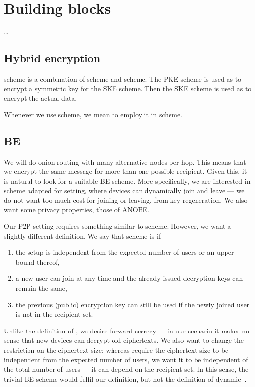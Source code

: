 \section{Building blocks}%
\label{BuildingBlocks}

\dots

\subsection{Hybrid encryption}\label{KEM}

 scheme is a combination of  scheme and  scheme.
The \ac{PKE} scheme is used as  to encrypt a symmetric key for the 
\ac{SKE} scheme.
Then the \ac{SKE} scheme is used as  to encrypt the actual data.

Whenever we use  scheme, we mean to employ it in  scheme.

\subsection{\Acl*{BE}}\label{BE}

We will do onion routing with many alternative nodes per hop.
This means that we encrypt the same message for more than one possible 
recipient.
Given this, it is natural to look for a suitable \ac{BE} scheme.
More specifically, we are interested in  scheme adapted for  
setting, where devices can dynamically join and leave --- \ie we do not want too 
much cost for joining or leaving, \eg from key regeneration.
We also want some privacy properties, \eg those of \ac{ANOBE}.

Our \ac{P2P} setting requires something similar to  scheme.
However, we want a slightly different definition.
We say that  scheme is  if
\begin{enumerate}
  \item the setup is independent from the expected number of users or an upper 
    bound thereof,
  \item a new user can join at any time and the already issued decryption keys 
    can remain the same,
  \item the previous (public) encryption key can still be used if the newly 
    joined user is not in the recipient set.
\end{enumerate}
Unlike the definition of \textcite{DynamicBroadcastEncryption}, we desire 
forward secrecy --- in our scenario it makes no sense that new devices can 
decrypt old ciphertexts.
We also want to change the restriction on the ciphertext size:
whereas \textcite{DynamicBroadcastEncryption} require the ciphertext size to be 
independent from the expected number of users, we want it to be independent of 
the total number of users --- \ie it can depend on the recipient set.
In this sense, the trivial \ac{BE} scheme would fulfil our definition, but not 
the definition of dynamic~\cite{DynamicBroadcastEncryption}.

